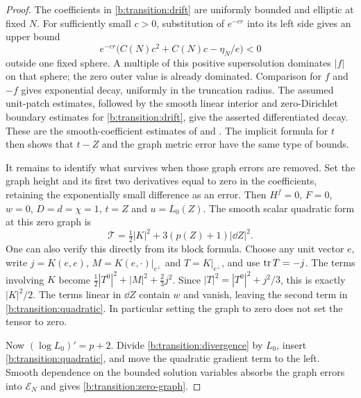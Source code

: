 \begin{proof}
The coefficients in \eqref{b:transition:drift} are uniformly bounded
and elliptic at fixed $N$.  For sufficiently small $c>0$, substitution
of $e^{-cr}$ into its left side gives an upper bound
\[
 e^{-cr}\bigl(C(N)c^2+C(N)c-\eta_N/e\bigr)<0
\]
outside one fixed sphere.  A multiple of this positive supersolution
dominates $|f|$ on that sphere; the zero outer value is already dominated.
Comparison for $f$ and $-f$ gives exponential decay, uniformly in the
truncation radius.  The assumed unit-patch estimates, followed by the
smooth linear interior and zero-Dirichlet boundary estimates for
\eqref{b:transition:drift}, give the asserted differentiated decay.
These are the smooth-coefficient estimates of
\cite[Chs.~6--9]{GilbargTrudinger2001} and
\cite{AgmonDouglisNirenberg1959}.
The implicit formula for $t$ then shows that $t-Z$ and the graph metric
error have the same type of bounds.

It remains to identify what survives when those graph errors are removed.
Set the graph height and its first two derivatives equal to zero in
the coefficients, retaining the exponentially small difference as an
error.  Then $H^f=0$, $F=0$, $w=0$, $D=d=\chi=1$, $t=Z$ and
$u=L_0(Z)$.  The smooth scalar quadratic form at this zero graph is
\begin{equation}\label{b:transition:quadratic}
 \mathcal T=\tfrac12|K|^2+3(p(Z)+1)|\dd Z|^2.
\end{equation}
One can also verify this directly from its block formula.  Choose any
unit vector $e$, write $j=K(e,e)$, $M=K(e,\cdot)|_{e^\perp}$ and
$T=K|_{e^\perp}$, and use $\operatorname{tr} T=-j$.  The terms involving $K$ become
$\tfrac12|T^0|^2+|M|^2+\tfrac23j^2$.
Since $|T|^2=|T^0|^2+j^2/3$, this is exactly $|K|^2/2$.
The terms linear in $\dd Z$ contain $w$ and vanish, leaving the
second term in \eqref{b:transition:quadratic}.  In particular setting
the graph to zero does not set the tensor to zero.

Now $(\log L_0)'=p+2$.  Divide
\eqref{b:transition:divergence} by $L_0$, insert
\eqref{b:transition:quadratic}, and move the quadratic gradient term
to the left.  Smooth dependence on the bounded solution variables
absorbs the graph errors into $\mathcal E_N$ and gives
\eqref{b:transition:zero-graph}.


\end{proof}
